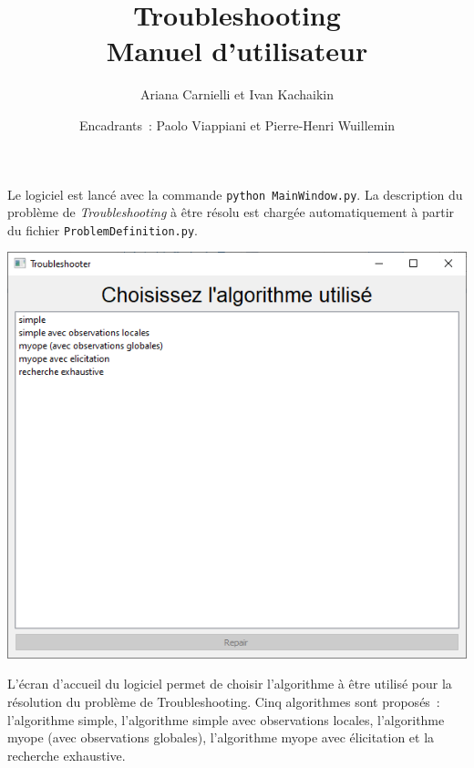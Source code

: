 \documentclass[a4paper,11pt]{article}
\theoremstyle{plain}
\theoremstyle{definition}
\begin{document}

\pagestyle{plain}

\title{Troubleshooting \\ Manuel d'utilisateur}
\author{Ariana Carnielli et Ivan Kachaikin}
\date{Encadrants~: Paolo Viappiani et Pierre-Henri Wuillemin}
\maketitle

Le logiciel est lancé avec la commande \texttt{python MainWindow.py}. La description du problème de \emph{Troubleshooting} à être résolu est chargée automatiquement à partir du fichier \texttt{ProblemDefinition.py}.

\begin{center}
\includegraphics[scale=0.667]{Figures/tela_inicial.png}
\end{center}
L'écran d'accueil du logiciel permet de choisir l'algorithme à être utilisé pour la résolution du problème de Troubleshooting. Cinq algorithmes sont proposés~: l'algorithme simple, l'algorithme simple avec observations locales, l'algorithme myope (avec observations globales), l'algorithme myope avec élicitation et la recherche exhaustive.
\end{document}
